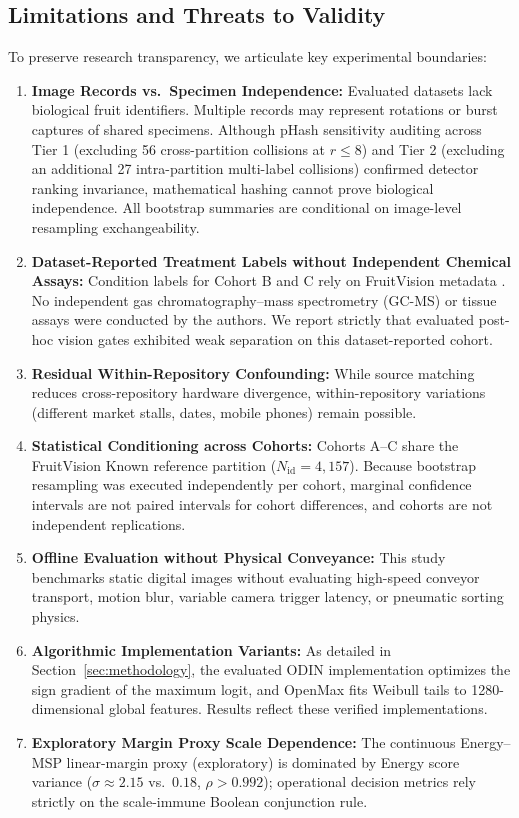 \subsection{Limitations and Threats to Validity}
To preserve research transparency, we articulate key experimental boundaries:
\begin{enumerate}
\setlength{\itemsep}{0pt}\setlength{\parsep}{0pt}\setlength{\parskip}{0pt}\setlength{\topsep}{1pt}\setlength{\partopsep}{0pt}
\item \textbf{Image Records vs.\ Specimen Independence:} Evaluated datasets lack biological fruit identifiers. Multiple records may represent rotations or burst captures of shared specimens. Although pHash sensitivity auditing across Tier 1 (excluding 56 cross-partition collisions at $r \le 8$) and Tier 2 (excluding an additional 27 intra-partition multi-label collisions) confirmed detector ranking invariance, mathematical hashing cannot prove biological independence. All bootstrap summaries are conditional on image-level resampling exchangeability.
\item \textbf{Dataset-Reported Treatment Labels without Independent Chemical Assays:} Condition labels for Cohort B and C rely on FruitVision metadata \cite{bijoy2025fruitvision}. No independent gas chromatography--mass spectrometry (GC-MS) or tissue assays were conducted by the authors. We report strictly that evaluated post-hoc vision gates exhibited weak separation on this dataset-reported cohort.
\item \textbf{Residual Within-Repository Confounding:} While source matching reduces cross-repository hardware divergence, within-repository variations (different market stalls, dates, mobile phones) remain possible.
\item \textbf{Statistical Conditioning across Cohorts:} Cohorts A--C share the FruitVision Known reference partition ($N_{\text{id}} = 4,157$). Because bootstrap resampling was executed independently per cohort, marginal confidence intervals are not paired intervals for cohort differences, and cohorts are not independent replications.
\item \textbf{Offline Evaluation without Physical Conveyance:} This study benchmarks static digital images without evaluating high-speed conveyor transport, motion blur, variable camera trigger latency, or pneumatic sorting physics.
\item \textbf{Algorithmic Implementation Variants:} As detailed in Section~\ref{sec:methodology}, the evaluated ODIN implementation optimizes the sign gradient of the maximum logit, and OpenMax fits Weibull tails to 1280-dimensional global features. Results reflect these verified implementations.
\item \textbf{Exploratory Margin Proxy Scale Dependence:} The continuous Energy--MSP linear-margin proxy (exploratory) is dominated by Energy score variance ($\sigma \approx 2.15$ vs.\ $0.18$, $\rho > 0.992$); operational decision metrics rely strictly on the scale-immune Boolean conjunction rule.
\end{enumerate}
